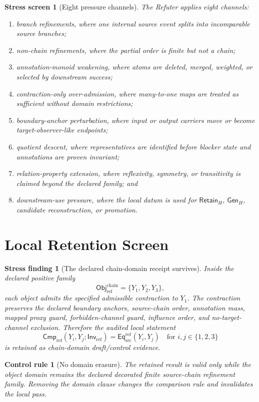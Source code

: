 \documentclass[11pt]{article}
\newcommand{\EqRef}{\mathsf{Eq}_{\mathrm{src}}^{\mathrm{ref}}}
\newcommand{\ObjRef}{\mathsf{Obj}_{\mathrm{ref}}}
\newcommand{\InvRef}{\mathsf{Inv}_{\mathrm{ref}}}
\newcommand{\CmpRef}{\mathsf{Cmp}_{\mathrm{ref}}}
\newcommand{\RetainH}{\mathsf{Retain}_{H}}
\newcommand{\GenH}{\mathsf{Gen}_{H}}
\newtheorem{stressscreen}{Stress screen}
\newtheorem{stressfinding}{Stress finding}
\newtheorem{controlrule}{Control rule}
\begin{document}
\begin{stressscreen}[Eight pressure channels]
The Refuter applies eight channels:
\begin{enumerate}
    \item branch refinements, where one internal source event splits
    into incomparable source branches;
    \item non-chain refinements, where the partial order is finite but
    not a chain;
    \item annotation-monoid weakening, where atoms are deleted, merged,
    weighted, or selected by downstream success;
    \item contraction-only over-admission, where many-to-one maps are
    treated as sufficient without domain restrictions;
    \item boundary-anchor perturbation, where input or output carriers
    move or become target-observer-like endpoints;
    \item quotient descent, where representatives are identified before
    blocker state and annotations are proven invariant;
    \item relation-property extension, where reflexivity, symmetry, or
    transitivity is claimed beyond the declared family; and
    \item downstream-use pressure, where the local datum is used for
    \(\RetainH\), \(\GenH\), candidate reconstruction, or promotion.
\end{enumerate}
\end{stressscreen}

\section{Local Retention Screen}

\begin{stressfinding}[The declared chain-domain receipt survives]
Inside the declared positive family
\[
    \ObjRef^{\mathrm{chain}}=\{Y_{1},Y_{2},Y_{3}\},
\]
each object admits the specified admissible contraction to \(Y_{1}\).
The contraction preserves the declared boundary anchors, source-chain
order, annotation mass, mapped proxy guard, forbidden-channel guard,
influence order, and no-target-channel exclusion. Therefore the audited
local statement
\[
    \CmpRef(Y_i,Y_j;\InvRef)=\EqRef(Y_i,Y_j)
    \quad\text{for } i,j\in\{1,2,3\}
\]
is retained as chain-domain draft/control evidence.
\end{stressfinding}

\begin{controlrule}[No domain erasure]
The retained result is valid only while the object domain remains the
declared decorated finite source-chain refinement family. Removing the
domain clause changes the comparison rule and invalidates the local pass.
\end{controlrule}
\end{document}
